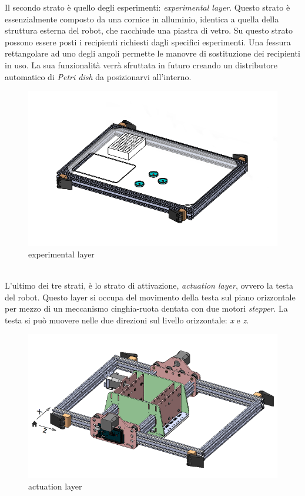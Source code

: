 \pagebreak
Il secondo strato è quello degli esperimenti: \emph{experimental layer}. Questo strato è essenzialmente composto da una cornice in alluminio, identica a quella della struttura esterna del robot, che racchiude una piastra di vetro. Su questo strato possono essere posti i recipienti richiesti dagli specifici esperimenti. Una fessura rettangolare ad uno degli angoli permette le manovre di sostituzione dei recipienti in uso. La sua funzionalità verrà sfruttata in futuro creando un distributore automatico di  \emph{Petri dish} da posizionarvi all'interno.
	\begin{figure}[h]
	  \includegraphics[scale=0.40]{immagini/experiment_layer.png}
		\centering 
	\caption{experimental layer}
	\end{figure} 
\\L'ultimo dei tre strati, è lo strato di attivazione, \emph{actuation layer}, ovvero la testa del robot.  Questo layer si occupa del movimento della testa sul piano orizzontale per mezzo di un meccanismo cinghia-ruota dentata con due motori \emph{stepper}. La testa si può muovere nelle due direzioni sul livello orizzontale: \emph{x} e \emph{z}.

	\begin{figure}[h]
	  \includegraphics[scale=0.30]{immagini/actuation_layer.png}
		\centering	
	 \caption{actuation layer}
	\end{figure}
\pagebreak

